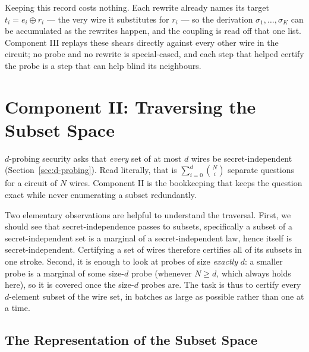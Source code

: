   Keeping this record costs nothing. Each rewrite already names its target
  $t_i = e_i \oplus r_i$ --- the very wire it substitutes for $r_i$ --- so the
  derivation $\sigma_1, \dots, \sigma_K$ can be accumulated as the rewrites happen,
  and the coupling is read off that one list. Component III replays these shears
  directly against every other wire in the circuit; no probe and no rewrite is
  special-cased, and each step that helped certify the probe is a step that can help
  blind its neighbours.

\section{Component II: Traversing the Subset Space}
\label{sec:subset-space}

$d$-probing security asks that \emph{every} set of at most $d$ wires be
secret-independent (Section~\ref{sec:d-probing}). Read literally, that is
$\sum_{i=0}^{d} \binom{N}{i}$ separate questions for a circuit of $N$ wires.
Component II is the
bookkeeping that keeps the question exact while never enumerating a subset
redundantly.

Two elementary observations are helpful to understand the traversal.
First, we should see that secret-independence passes to
subsets, specifically a subset of a secret-independent set is a marginal of a
secret-independent law, hence itself is secret-independent. Certifying a set
of wires therefore certifies all of its subsets in one stroke. 
Second, it is enough to look at probes of size
\emph{exactly} $d$: a smaller probe is a marginal of some size-$d$ probe
(whenever $N \ge d$, which always holds here), so it is covered once the size-$d$
probes are. The task is thus to certify every $d$-element subset of the wire set,
in batches as large as possible rather than one at a time.

  \subsection{The Representation of the Subset Space}
  \label{sec:represent-subsets}


